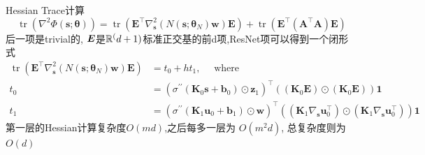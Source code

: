 \documentclass{article}
\begin{document}
\begin{flushleft}
    Hessian Trace计算
    \begin{equation}
        \operatorname{tr}\left(\nabla^{2} \Phi(\boldsymbol{s} ; \boldsymbol{\theta})\right)=\operatorname{tr}\left(\boldsymbol{E}^{\top} \nabla_{\boldsymbol{s}}^{2}\left(N\left(\boldsymbol{s} ; \boldsymbol{\theta}_{N}\right) \boldsymbol{w}\right) \boldsymbol{E}\right)+\operatorname{tr}\left(\boldsymbol{E}^{\top}\left(\boldsymbol{A}^{\top} \boldsymbol{A}\right) \boldsymbol{E}\right)
    \end{equation}
    后一项是trivial的, $\boldsymbol{E}$是$\mathbb{R}^(d+1)$标准正交基的前d项,ResNet项可以得到一个闭形式
    \begin{equation}
        \begin{aligned}
        \operatorname{tr}\left(\boldsymbol{E}^{\top} \nabla_{\boldsymbol{s}}^{2}\left(N\left(\boldsymbol{s} ; \boldsymbol{\theta}_{N}\right) \boldsymbol{w}\right) \boldsymbol{E}\right) &=t_{0}+h t_{1}, \quad \text { where } \\
        t_{0} &=\left(\sigma^{\prime \prime}\left(\boldsymbol{K}_{0} \boldsymbol{s}+\boldsymbol{b}_{0}\right) \odot \boldsymbol{z}_{1}\right)^{\top}\left(\left(\boldsymbol{K}_{0} \boldsymbol{E}\right) \odot\left(\boldsymbol{K}_{0} \boldsymbol{E}\right)\right) \boldsymbol{1} \\
        t_{1} &=\left(\sigma^{\prime \prime}\left(\boldsymbol{K}_{1} \boldsymbol{u}_{0}+\boldsymbol{b}_{1}\right) \odot \boldsymbol{w}\right)^{\top}\left(\left(\boldsymbol{K}_{1} \nabla_{\boldsymbol{s}} \boldsymbol{u}_{0}^{\top}\right) \odot\left(\boldsymbol{K}_{1} \nabla_{\boldsymbol{s}} \boldsymbol{u}_{0}^{\top}\right)\right) \mathbf{1}
        \end{aligned}
    \end{equation}
    第一层的Hessian计算复杂度$O(m d)$,之后每多一层为 $O(m^2 d)$, 总复杂度则为$O(d)$

\end{flushleft}
\end{document}
